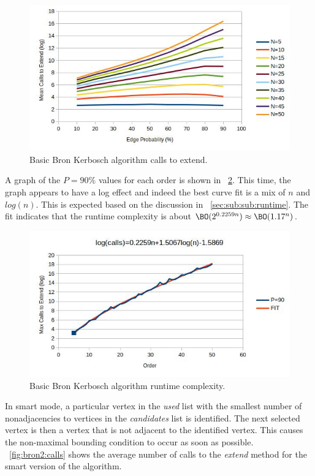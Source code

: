 \begin{figure}[H]
  \centering
  \includegraphics[width=5in]{bron1_calls}
  \caption{Basic Bron Kerbosch algorithm calls to extend.}
  \label{fig:bron1:calls}
\end{figure}

A graph of the \(P=90\%\) values for each order is shown in \figurename~\ref{fig:bron1:runtime}.  This time, the
graph appears to have a log effect and indeed the best curve fit is a mix of \(n\) and \(log(n)\).  This is expected
based on the discussion in \sectionname~\ref{sec:sub:sub:runtime}.  The fit indicates that the runtime complexity is
about \(\BO(2^{0.2259n})\approx\BO(1.17^n)\).

\begin{figure}[H]
  \centering
  \includegraphics[width=5in]{bron1_runtime}
  \caption{Basic Bron Kerbosch algorithm runtime complexity.}
  \label{fig:bron1:runtime}
\end{figure}

In smart mode, a particular vertex in the \emph{used} list with the smallest number of nonadjacencies to vertices
in the \emph{candidates} list is identified.  The next selected vertex is then a vertex that is not adjacent to the
identified vertex.  This causes the non-maximal bounding condition to occur as soon as possible.
\figurename~\ref{fig:bron2:calls} shows the average number of calls to the \emph{extend} method for the smart
version of the algorithm.

